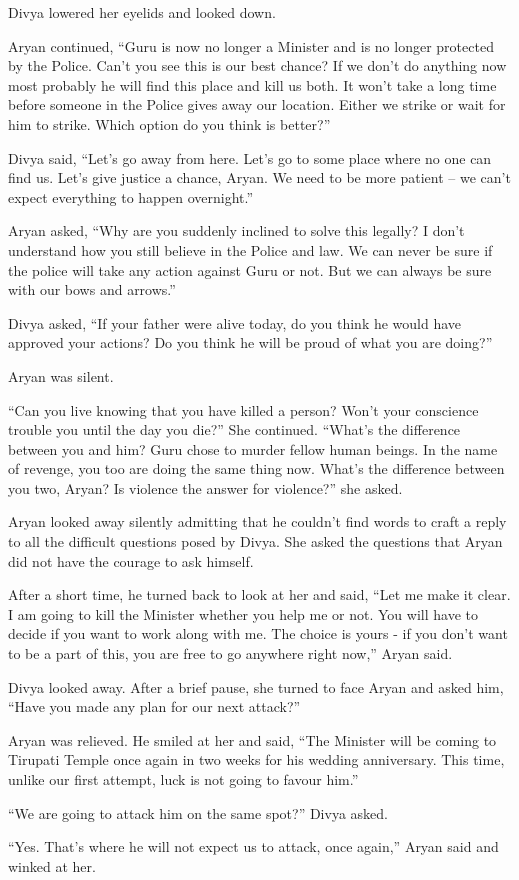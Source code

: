 Divya lowered her eyelids and looked down.

Aryan continued, “Guru is now no longer a Minister and is no longer protected by
the Police. Can't you see this is our best chance? If we don't do anything now
most probably he will find this place and kill us both. It won't take a long
time before someone in the Police gives away our location. Either we strike or
wait for him to strike. Which option do you think is better?”

Divya said, “Let's go away from here. Let's go to some place where no one can
find us. Let's give justice a chance, Aryan. We need to be more patient – we
can't expect everything to happen overnight.”

Aryan asked, “Why are you suddenly inclined to solve this legally? I don't
understand how you still believe in the Police and law. We can never be sure if
the police will take any action against Guru or not. But we can always be sure
with our bows and arrows.”

Divya asked, “If your father were alive today, do you think he would have
approved your actions? Do you think he will be proud of what you are doing?”

Aryan was silent.

“Can you live knowing that you have killed a person? Won't your conscience
trouble you until the day you die?” She continued. “What's the difference
between you and him? Guru chose to murder fellow human beings. In the name of
revenge, you too are doing the same thing now. What's the difference between you
two, Aryan? Is violence the answer for violence?” she asked.

Aryan looked away silently admitting that he couldn't find words to craft a
reply to all the difficult questions posed by Divya. She asked the questions
that Aryan did not have the courage to ask himself.

After a short time, he turned back to look at her and said, “Let me make it
clear. I am going to kill the Minister whether you help me or not. You will have
to decide if you want to work along with me. The choice is yours - if you don't
want to be a part of this, you are free to go anywhere right now,” Aryan said.

Divya looked away. After a brief pause, she turned to face Aryan and asked him,
“Have you made any plan for our next attack?”

Aryan was relieved. He smiled at her and said, “The Minister will be coming to
Tirupati Temple once again in two weeks for his wedding anniversary. This time,
unlike our first attempt, luck is not going to favour him.”

“We are going to attack him on the same spot?” Divya asked.

“Yes. That's where he will not expect us to attack, once again,” Aryan said and
winked at her.